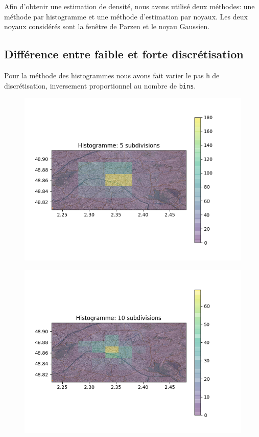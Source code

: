 \documentclass[a4paper]{article}
\begin{document}
Afin d'obtenir une estimation de densité, nous avons utilisé deux méthodes: une méthode par histogramme et une méthode d'estimation par noyaux. Les deux noyaux considérés sont la fenêtre de Parzen et le noyau Gaussien.

\subsection*{Différence entre faible et forte discrétisation}

Pour la méthode des histogrammes nous avons fait varier le pas \verb!h! de discrétisation, inversement proportionnel au nombre de \verb!bins!.

\begin{figure}[ht!]
\begin{center}
\begin{minipage}{0.45\textwidth}
\includegraphics[scale=0.5]{Histo5.png}
\label{f1_trajectoire}
\end{minipage}\hfill
\begin{minipage}{0.45\textwidth}
\includegraphics[scale=0.5]{Histo10.png}
\label{f2_trajectoire}
\end{minipage}
\end{center}
\end{figure}
\end{document}
